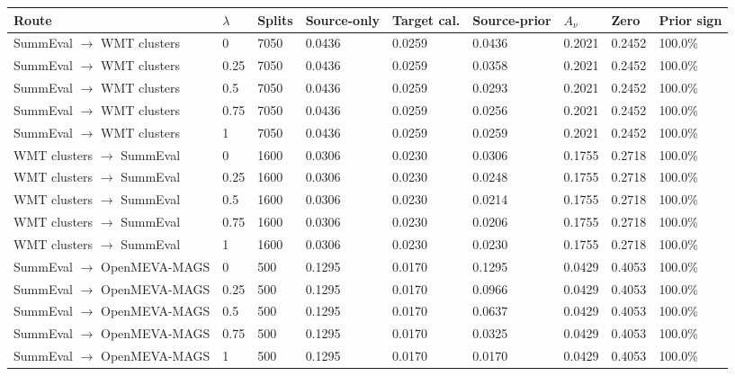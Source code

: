 \begin{tabular}{lllllllll}
\toprule
Route & $\lambda$ & Splits & Source-only & Target cal. & Source-prior & $A_\nu$ & Zero & Prior sign \\
\midrule
SummEval $\rightarrow$ WMT clusters & 0 & 7050 & 0.0436 & 0.0259 & 0.0436 & 0.2021 & 0.2452 & 100.0\% \\
SummEval $\rightarrow$ WMT clusters & 0.25 & 7050 & 0.0436 & 0.0259 & 0.0358 & 0.2021 & 0.2452 & 100.0\% \\
SummEval $\rightarrow$ WMT clusters & 0.5 & 7050 & 0.0436 & 0.0259 & 0.0293 & 0.2021 & 0.2452 & 100.0\% \\
SummEval $\rightarrow$ WMT clusters & 0.75 & 7050 & 0.0436 & 0.0259 & 0.0256 & 0.2021 & 0.2452 & 100.0\% \\
SummEval $\rightarrow$ WMT clusters & 1 & 7050 & 0.0436 & 0.0259 & 0.0259 & 0.2021 & 0.2452 & 100.0\% \\
WMT clusters $\rightarrow$ SummEval & 0 & 1600 & 0.0306 & 0.0230 & 0.0306 & 0.1755 & 0.2718 & 100.0\% \\
WMT clusters $\rightarrow$ SummEval & 0.25 & 1600 & 0.0306 & 0.0230 & 0.0248 & 0.1755 & 0.2718 & 100.0\% \\
WMT clusters $\rightarrow$ SummEval & 0.5 & 1600 & 0.0306 & 0.0230 & 0.0214 & 0.1755 & 0.2718 & 100.0\% \\
WMT clusters $\rightarrow$ SummEval & 0.75 & 1600 & 0.0306 & 0.0230 & 0.0206 & 0.1755 & 0.2718 & 100.0\% \\
WMT clusters $\rightarrow$ SummEval & 1 & 1600 & 0.0306 & 0.0230 & 0.0230 & 0.1755 & 0.2718 & 100.0\% \\
SummEval $\rightarrow$ OpenMEVA-MAGS & 0 & 500 & 0.1295 & 0.0170 & 0.1295 & 0.0429 & 0.4053 & 100.0\% \\
SummEval $\rightarrow$ OpenMEVA-MAGS & 0.25 & 500 & 0.1295 & 0.0170 & 0.0966 & 0.0429 & 0.4053 & 100.0\% \\
SummEval $\rightarrow$ OpenMEVA-MAGS & 0.5 & 500 & 0.1295 & 0.0170 & 0.0637 & 0.0429 & 0.4053 & 100.0\% \\
SummEval $\rightarrow$ OpenMEVA-MAGS & 0.75 & 500 & 0.1295 & 0.0170 & 0.0325 & 0.0429 & 0.4053 & 100.0\% \\
SummEval $\rightarrow$ OpenMEVA-MAGS & 1 & 500 & 0.1295 & 0.0170 & 0.0170 & 0.0429 & 0.4053 & 100.0\% \\
\bottomrule
\end{tabular}

